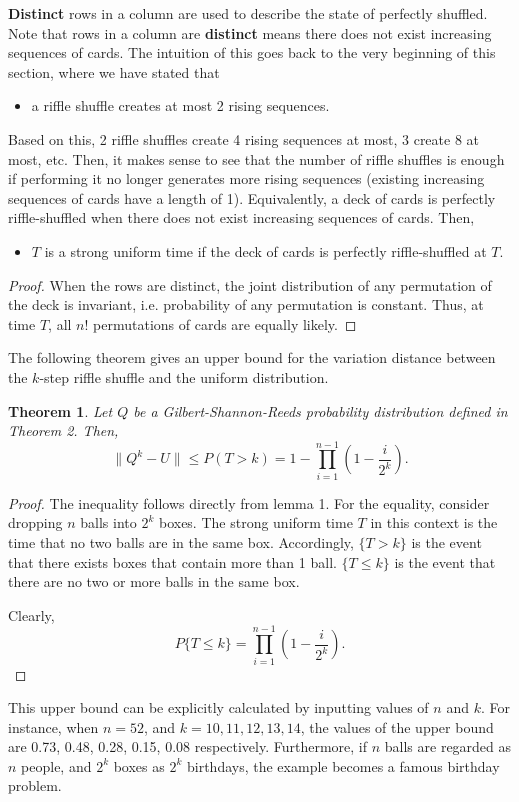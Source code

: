 \documentclass[12pt]{article}
\theoremstyle{plain}
\newtheorem{theorem}{Theorem}
\theoremstyle{definition}
\theoremstyle{remark}
\begin{document}
\textbf{Distinct} rows in a column are used to describe the state of perfectly shuffled. Note that rows in a column are \textbf{distinct} means there does not exist increasing sequences of cards. The intuition of this goes back to the very beginning of this section, where we have stated that 
\begin{itemize}
    \item a riffle shuffle creates at most 2 rising sequences.
\end{itemize}
Based on this, 2 riffle shuffles create 4 rising sequences at most, 3 create 8 at most, etc. Then, it makes sense to see that the number of riffle shuffles is enough if performing it no longer generates more rising sequences (existing increasing sequences of cards have a length of 1). Equivalently, a deck of cards is perfectly riffle-shuffled when there does not exist increasing sequences of cards. Then,
\begin{itemize}
    \item $T$ is a strong uniform time if the deck of cards is perfectly riffle-shuffled at $T$.
\end{itemize}

\begin{proof}\cite{1.1}
When the rows are distinct, the joint distribution of any permutation of the deck is invariant, i.e. probability of any permutation is constant. Thus, at time $T$, all $n!$ permutations of cards are equally likely.
\end{proof}

The following theorem gives an upper bound for the variation distance between the $k$-step riffle shuffle and the uniform distribution.

\begin{theorem}\cite[Theorem~5 on \pno~344]{1.1}
Let $Q$ be a Gilbert-Shannon-Reeds probability distribution defined in Theorem 2. Then,
\[   \big\|Q^k-U\big\| \leq P(T > k) = 1 - \prod_{i=1}^{n-1}(1-\frac{i}{2^k}).  \]
\end{theorem}

\begin{proof}
The inequality follows directly from lemma 1. For the equality, consider dropping $n$ balls into $2^k$ boxes. The strong uniform time $T$ in this context is the time that no two balls are in the same box.  Accordingly, $\{T>k\}$ is the event that there exists boxes that contain more than 1 ball. $\{T\leq k\}$ is the event that there are no two or more balls in the same box. 

Clearly, $$P\{T\leq k\}=\prod_{i=1}^{n-1}(1-\frac{i}{2^k}).$$
\end{proof}
This upper bound can be explicitly calculated by inputting values of $n$ and $k$. For instance\cite[344]{1.1}, when $n=52$, and $k=10, 11, 12, 13, 14$, the values of the upper bound are 0.73, 0.48, 0.28, 0.15, 0.08 respectively. Furthermore, if $n$ balls are regarded as $n$ people, and $2^k$ boxes as $2^k$ birthdays, the example becomes a famous birthday problem.\cite{1.1}
\end{document}
